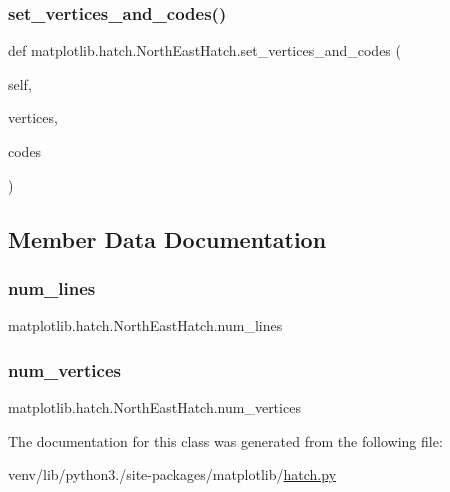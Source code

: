 \subsubsection{\texorpdfstring{set\+\_\+vertices\+\_\+and\+\_\+codes()}{set\_vertices\_and\_codes()}}
{\footnotesize\ttfamily def matplotlib.\+hatch.\+North\+East\+Hatch.\+set\+\_\+vertices\+\_\+and\+\_\+codes (\begin{DoxyParamCaption}\item[{}]{self,  }\item[{}]{vertices,  }\item[{}]{codes }\end{DoxyParamCaption})}



\subsection{Member Data Documentation}
\mbox{\label{classmatplotlib_1_1hatch_1_1NorthEastHatch_a709c651f2bd7ef11c0491b853ce62ddc}} 
\subsubsection{\texorpdfstring{num\+\_\+lines}{num\_lines}}
{\footnotesize\ttfamily matplotlib.\+hatch.\+North\+East\+Hatch.\+num\+\_\+lines}

\mbox{\label{classmatplotlib_1_1hatch_1_1NorthEastHatch_a852a87192e136de93df083b4bc86e863}} 
\subsubsection{\texorpdfstring{num\+\_\+vertices}{num\_vertices}}
{\footnotesize\ttfamily matplotlib.\+hatch.\+North\+East\+Hatch.\+num\+\_\+vertices}



The documentation for this class was generated from the following file\+:\begin{DoxyCompactItemize}
\item 
venv/lib/python3./site-\/packages/matplotlib/\hyperlink{hatch_8py}{hatch.\+py}\end{DoxyCompactItemize}
